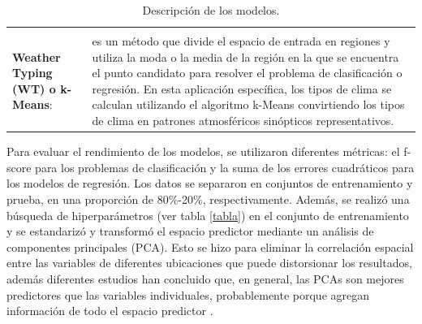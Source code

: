 \documentclass[12pt]{article}
\begin{document}
\begin{table}
\begin{tabular}{|p{2.0cm}|p{14.0cm}| }
    &\\
    \textbf {Weather Typing (WT) o k-Means}:  & es un método que divide el espacio de entrada en regiones y utiliza la moda o la media de la región en la que se encuentra el punto candidato para resolver el problema de clasificación o regresión. En esta aplicación específica, los tipos de clima se calculan utilizando el algoritmo k-Means convirtiendo los tipos de clima en patrones atmosféricos sinópticos representativos. \\    
\hline
\end{tabular}
\caption{Descripción de los modelos.}
 \label{tabla0}
\end{table}

Para evaluar el rendimiento de los modelos, se utilizaron diferentes métricas: el f-score para los problemas de clasificación y la suma de los errores cuadráticos para los modelos de regresión. Los datos se separaron en conjuntos de entrenamiento y prueba, en una proporción de 80$\%$-20$\%$, respectivamente. Además, se realizó una búsqueda de hiperparámetros (ver tabla \ref{tabla}) en el conjunto de entrenamiento y se estandarizó y transformó el espacio predictor mediante un análisis de componentes principales (PCA). Esto se hizo para eliminar la correlación espacial entre las variables de diferentes ubicaciones que puede distorsionar los resultados, además diferentes estudios han concluido que, en general, las PCAs son mejores predictores que las variables individuales, probablemente porque agregan información de todo el espacio predictor \citep{Gutiérrez, Preisendorfer, San-Martin}.
\end{document}
